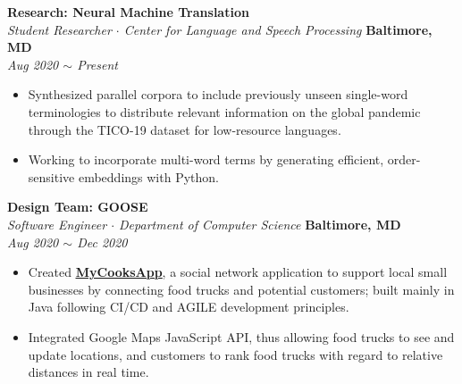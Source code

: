 \documentclass[10pt, letterpaper]{article}
\begin{document}
\begin{paracol}{2}
	\textbf{Research: Neural Machine Translation}\\
	\textit{Student Researcher $\cdot$ Center for Language and Speech Processing}
	\switchcolumn
	\raggedleft\textbf{Baltimore, MD}\\
	\raggedleft\textit{Aug 2020 $\sim$ Present}
\end{paracol}%
\vspace{-5mm}
\begin{itemize}
	 \item Synthesized parallel corpora to include previously unseen single-word terminologies to distribute relevant information on the global pandemic through the TICO-19 dataset for low-resource languages.\vspace{-3mm}
	 \item Working to incorporate multi-word terms by generating efficient, order-sensitive embeddings with Python.
\end{itemize}
\vspace{-3mm} 

\begin{paracol}{2}
	\textbf{Design Team: GOOSE}\\
	\textit{Software Engineer $\cdot$ Department of Computer Science }
	\switchcolumn
	\raggedleft\textbf{Baltimore, MD}\\
	\raggedleft\textit{Aug 2020 $\sim$ Dec 2020}
\end{paracol}\vspace{-5mm}
\begin{itemize}
	\item Created \href{https://goosegang-foodtruck.herokuapp.com/}{\textbf{\underline{MyCooksApp}}}, a social network application to support local small businesses by connecting food trucks and potential customers; built mainly in Java following CI/CD and AGILE development principles.\vspace{-3mm}
	\item Integrated Google Maps JavaScript API, thus allowing food trucks to see and update locations, and customers to rank food trucks with regard to relative distances in real time.
\end{itemize}
\vspace{-3mm} 
\end{document}
